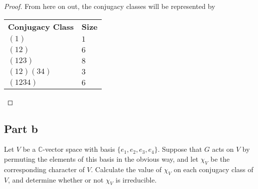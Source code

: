 \documentclass[12pt,reqno]{amsart}
\newcommand{\C}{\mathbb{C}}
\begin{document}
\begin{proof}
    From here on out, the conjugacy classes will be represented by
    \begin{center}
        \begin{tabular}{l|l}
            \textbf{Conjugacy Class} &\textbf{Size}\\
            $(1)$ &$1$\\
            $(12)$ &$6$\\
            $(123)$ & $8$\\
            $(12)(34)$ & $3$\\
            $(1234)$ &$6$\\
        \end{tabular}
    \end{center}
\end{proof}

\subsection*{Part b}
Let $V$ be a $\C$-vector space with basis $\{e_1,e_2,e_3,e_4\}$. Suppose that
$G$ acts on $V$ by permuting the elements of this basis in the obvious way, and
let $\chi_V$ be the corresponding character of $V$. Calculate the value of
$\chi_V$ on each conjugacy class of $V$, and determine whether or not $\chi_V$
is irreducible.
\\
\\
\end{document}
